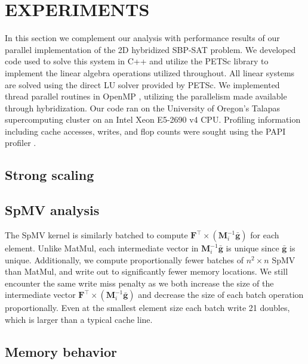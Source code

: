 %
%
%
\section{EXPERIMENTS}

%
%
%
In this section we complement our analysis with performance results of our parallel implementation of the 2D hybridized SBP-SAT problem.
We developed code used to solve this system in C++ and utilize the PETSc library to implement the linear algebra operations utilized throughout. 
All linear systems are solved using the direct LU solver provided by PETSc.
We implemented thread parallel routines in OpenMP \citep{openmp08}, utilizing the parallelism made available through hybridization.
Our code ran on the University of Oregon's Talapas supercomputing cluster on an Intel Xeon E5-2690 v4 CPU. 
Profiling information including cache accesses, writes, and flop counts were sought using the PAPI profiler \citep{jagode2019papi}.

%
%
%
\subsection{Strong scaling}



\subsection{SpMV analysis}
The SpMV kernel is similarly batched to compute $\textbf{F}^\intercal \times (\textbf{M}^{-1}_{i} \bar{\textbf{g}})$ for each element. 
Unlike MatMul, each intermediate vector in $\textbf{M}^{-1}_{i} \bar{\textbf{g}}$ is unique since $\bar{\textbf{g}}$ is unique. 
Additionally, we compute proportionally fewer batches of $n^2 \times n$ SpMV than MatMul, and write out to significantly fewer memory locations. 
We still encounter the same write miss penalty as we both increase the size of the intermediate vector $\textbf{F}^\intercal \times (\textbf{M}^{-1}_{i} \bar{\textbf{g}})$ and decrease the size of each batch operation proportionally.
Even at the smallest element size each batch write 21 doubles, which is larger than a typical cache line. 

%
%
%
\subsection{Memory behavior}

